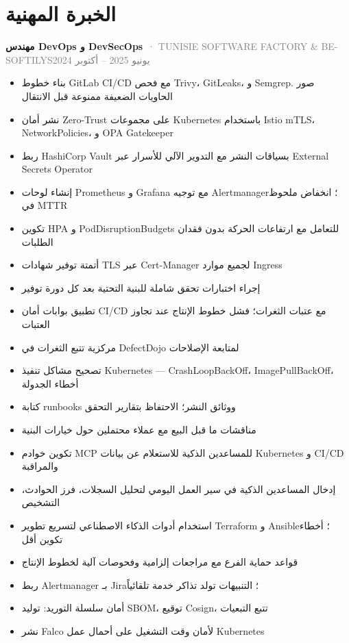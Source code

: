 \documentclass[10pt,a4paper]{article}
\newcommand{\cventry}[3]{\textbf{#1}\ \textcolor{graytext}{· #2}\hfill\textcolor{graytext}{\small #3}\par}
\begin{document}
\section*{الخبرة المهنية}
\cventry{مهندس DevOps و DevSecOps}{TUNISIE SOFTWARE FACTORY \& BE-SOFTILYS}{يونيو 2025 – أكتوبر 2024}
\begin{itemize}
  \item بناء خطوط GitLab CI/CD مع فحص Trivy، GitLeaks، و Semgrep. صور الحاويات الضعيفة ممنوعة قبل الانتقال
  \item نشر أمان Zero-Trust على مجموعات Kubernetes باستخدام Istio mTLS، NetworkPolicies، و OPA Gatekeeper
  \item ربط HashiCorp Vault بسياقات النشر مع التدوير الآلي للأسرار عبر External Secrets Operator
  \item إنشاء لوحات Prometheus و Grafana مع توجيه Alertmanager؛ انخفاض ملحوظ في MTTR
  \item تكوين HPA و PodDisruptionBudgets للتعامل مع ارتفاعات الحركة بدون فقدان الطلبات
  \item أتمتة توفير شهادات TLS عبر Cert-Manager لجميع موارد Ingress
  \item إجراء اختبارات تحقق شاملة للبنية التحتية بعد كل دورة توفير
  \item تطبيق بوابات أمان CI/CD مع عتبات الثغرات؛ فشل خطوط الإنتاج عند تجاوز العتبات
  \item مركزية تتبع الثغرات في DefectDojo لمتابعة الإصلاحات
  \item تصحيح مشاكل تنفيذ Kubernetes — CrashLoopBackOff، ImagePullBackOff، أخطاء الجدولة
  \item كتابة runbooks ووثائق النشر؛ الاحتفاظ بتقارير التحقق
  \item مناقشات ما قبل البيع مع عملاء محتملين حول خيارات البنية
  \item تكوين خوادم MCP للمساعدين الذكية للاستعلام عن بيانات Kubernetes و CI/CD والمراقبة
  \item إدخال المساعدين الذكية في سير العمل اليومي لتحليل السجلات، فرز الحوادث، التشخيص
  \item استخدام أدوات الذكاء الاصطناعي لتسريع تطوير Terraform و Ansible؛ أخطاء تكوين أقل
  \item قواعد حماية الفرع مع مراجعات إلزامية وفحوصات آلية لخطوط الإنتاج
  \item ربط Alertmanager بـ Jira؛ التنبيهات تولد تذاكر خدمة تلقائياً
  \item أمان سلسلة التوريد: توليد SBOM، توقيع Cosign، تتبع التبعيات
  \item نشر Falco لأمان وقت التشغيل على أحمال عمل Kubernetes
\end{itemize}
\end{document}
